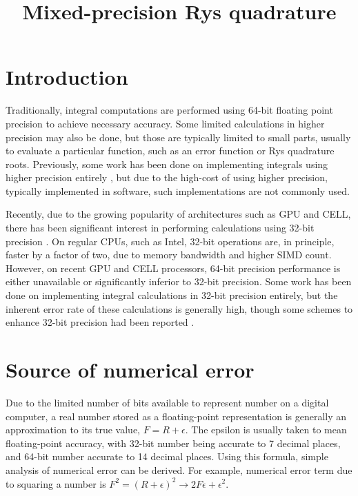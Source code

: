 \documentclass[12pt]{article}
\title{Mixed-precision Rys quadrature}
\date{}
\begin{document}
\maketitle 

\section{Introduction}

Traditionally, integral computations are performed using 64-bit floating point precision to achieve necessary accuracy.
Some limited calculations in higher precision may also be done, but those are typically limited to small parts, usually to evaluate
a particular function, such as an error function or Rys quadrature roots. 
Previously, some work has been done on implementing integrals using  higher precision entirely \cite{mike}, but due to the high-cost of using
higher precision, typically implemented in software, such implementations are not commonly used.

Recently, due to the growing popularity of architectures such as GPU and CELL, there has been significant interest in performing calculations using 32-bit precision
\cite{ufimtsev2008quantum,yasuda2008two}.
On regular CPUs, such as Intel, 32-bit operations are, in principle, faster by a factor of two, due to memory bandwidth and higher SIMD count.
However, on recent GPU and CELL processors,  64-bit precision performance is either unavailable or significantly inferior to 32-bit precision.
Some work has been done on implementing integral calculations in 32-bit precision entirely, but the inherent error rate of these calculations is generally high,
though some schemes to enhance 32-bit precision had been reported \cite{yasuda2008two}.


\section{Source of numerical error}
Due to the  limited number of bits available to represent number on a digital computer, a real number stored as a floating-point representation is generally an approximation
to its true value, $F = R + \epsilon $.  The epsilon is usually taken to mean floating-point accuracy, with 32-bit number being accurate to 7 decimal places,
and 64-bit number accurate to 14 decimal places.
Using this formula, simple analysis of numerical error can be derived.  For example, numerical error term due to squaring a number is
$F^2 = (R + \epsilon)^2 \to 2F\epsilon + \epsilon^2$.
\end{document}
